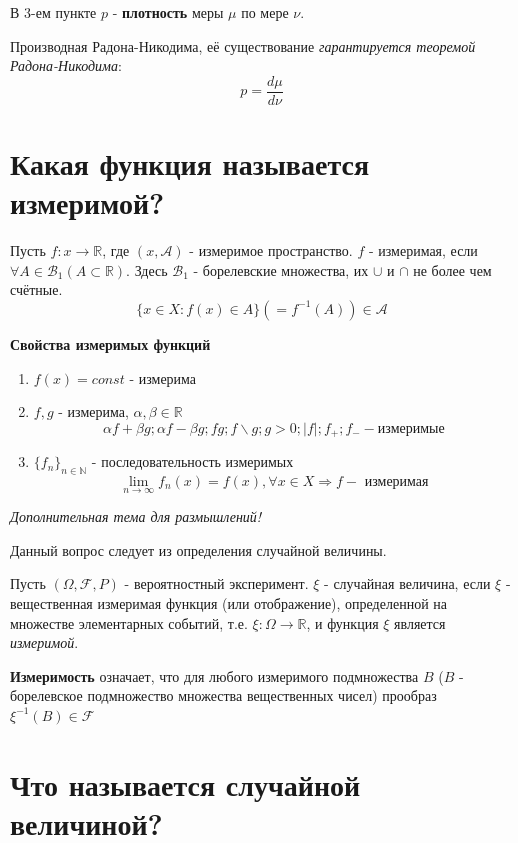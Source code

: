 \begin{remark}
	В 3-ем пункте $p$ - \textbf{плотность} меры $\mu$ по мере $\nu$.
	
	Производная Радона-Никодима, её существование \textit{гарантируется теоремой Радона-Никодима}:
	\[ p = \frac{d \mu}{d \nu} \]
\end{remark}

\section{Какая функция называется измеримой?}

Пусть $f: x \to \mathbb{R}$, где $(x, \mathcal{A})$ - измеримое пространство. $f$ - измеримая, если $\forall A \in \mathcal{B}_1 (A \subset \mathbb{R})$. Здесь $\mathcal{B}_1$ - борелевские множества, их $\cup$ и $\cap$ не более чем счётные.
\[ \{ x\in X: f(x) \in A \} (= f^{-1} (A)) \in \mathcal{A}\]

\textbf{Свойства измеримых функций}
\begin{enumerate}
	\item $f(x) = const$ - измерима
	\item $f,g$ - измерима, $\alpha, \beta \in \mathbb{R}$
	\[ \alpha f + \beta g; \alpha f - \beta g; fg; f \backslash g; g > 0; |f|; f_{+}; f_{-} - \text{измеримые} \]
	\item $\{ f_n \}_{n \in \mathbb{N}}$ - последовательность измеримых
	\[ \lim_{n \to \infty} f_n (x) = f(x), \forall x \in X \Rightarrow f - \text{ измеримая} \]
\end{enumerate}

\begin{center}
	\textit{Дополнительная тема для размышлений!}
\end{center}

Данный вопрос следует из определения случайной величины.

Пусть $(\Omega, \mathcal{F}, P)$ - вероятностный эксперимент. $\xi$ - случайная величина, если $\xi$ - вещественная измеримая функция (или отображение), определенной на множестве элементарных событий, т.е. $\xi: \Omega \to \mathbb{R}$, и функция $\xi$ является \textit{измеримой}.

\textbf{Измеримость} означает, что для любого измеримого подмножества $B$ ($B$ - борелевское подмножество множества вещественных чисел) прообраз $\xi^{-1} (B) \in \mathcal{F}$

\section{Что называется случайной величиной?}

